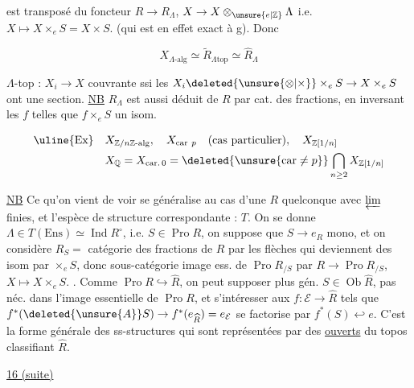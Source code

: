 est transposé du foncteur $R\longrightarrow R_\Lambda$, $X\to X\otimes_{\unsure{e|\mathbb Z}}\Lambda$ i.e.
$X\mapsto X\times_e S=X\times S$. 
(qui est en effet exact à g). Donc

\[
 X_{\Lambda\text{-alg}}\simeq\widetilde R_{\Lambda\mathrm{top}}\simeq\widehat R_\Lambda
\]

$\Lambda$-top : $X_i\to X$ couvrante ssi les $X_i\deleted{\unsure{\otimes|\times}}\times_e S\to X\times_e S$ ont une section.
\uline{NB} $R_\Lambda$ est aussi déduit de $R$ par cat. des fractions, en inversant les $f$ telles que $f\times_e S$ un isom.

\[
\begin{aligned}
 \text{\uline{Ex}}\quad &X_{\mathbb Z/n\mathbb Z\text{-alg}},\quad X_{\mathrm{car}\ p}\quad
 (\text{cas particulier}),\quad X_{\mathbb Z[1/n]}\\
 &X_{\mathbb Q}=X_{\mathrm{car.}\,0}=\deleted{\unsure{\mathrm{car}\neq p}}\bigcap_{n\geq2}X_{\mathbb Z[1/n]}
\end{aligned}
\]

\uline{NB} Ce qu'on vient de voir se généralise au cas d'une $R$ quelconque avec $\varprojlim$ finies, et l'espèce de structure correspondante : $T$.
On se donne $\Lambda\in T(\mathrm{Ens})\simeq\operatorname{Ind}R^\circ$, i.e. $S\in\operatorname{Pro} R$,
on suppose que $S\to e_R$  mono, et on considère $R_S=$ catégorie des fractions de $R$ par les flèches qui deviennent des isom par $\times_e S$,
donc sous-catégorie image ess. de $\operatorname{Pro}R_{/S}$ par $R\to\operatorname{Pro}R_{/S}$, $X\mapsto X\times_e S$. .
Comme $\operatorname{Pro} R\hookrightarrow\widehat R$,  on peut supposer plus gén. $S\in\operatorname{Ob}\widehat R$, 
pas néc. dans l'image essentielle de $\operatorname{Pro} R$, et s'intéresser aux $f:\mathcal E\to\widehat R$ tels que
$f^*(\deleted{\unsure{A}}S)\to f^*(e_{\widehat R})=e_{\mathcal E}$ se factorise par $f^*(S)\hookleftarrow e$.
C'est la forme générale des ss-structures qui sont représentées par des \uline{ouverts} du topos classifiant $\widehat R$.



\underline{16 (suite)}

